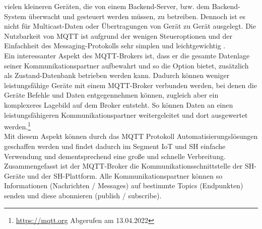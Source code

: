         vielen kleineren Geräten, die von einem Backend-Server, bzw. dem Backend-System überwacht und gesteuert werden müssen, zu 
        betreiben. Dennoch ist es nicht für Multicast-Daten oder Übertragungen von Gerät zu Gerät ausgelegt. Die Nutzbarkeit 
        von \acs{MQTT} ist aufgrund der wenigen Steueroptionen und der Einfachheit des Messaging-Protokolls sehr simplen und 
        leichtgewichtig \cite{Naik2017}. 
        \\
        \linebreak
        Ein interessanter Aspekt des \acs{MQTT}-Brokers ist, dass er die gesamte Datenlage seiner Kommunikationspartner aufbewahrt und 
        so die Option bietet, zusätzlich als Zustand-Datenbank betrieben werden kann. Dadurch können weniger leistungsfähige Geräte 
        mit einem \acs{MQTT}-Broker verbunden werden, bei denen die Geräte Befehle und Daten entgegennehmen können, zugleich aber ein 
        komplexeres Lagebild auf dem Broker entsteht. So können Daten an einen leistungsfähigeren Kommunikationspartner 
        weitergeleitet und dort ausgewertet werden.\footnote{\url{https://mqtt.org} Abgerufen am 13.04.2022}
        \\
        Mit diesem Aspekt können durch das \acl{MQTT} Protokoll Automatisierungslösungen geschaffen werden und findet dadurch im 
        Segment \acs{IoT} und \acl{SH} einfache Verwendung und dementsprechend eine große und schnelle Verbreitung. 
        \\
        \linebreak
        Zusammengefasst ist der \acs{MQTT}-Broker die Kommunikationsschnittstelle der \acl{SH}-Geräte und der \acl{SH}-Plattform. 
        Alle Kommunikationspartner können so Informationen (Nachrichten / Messages) auf bestimmte Topics (Endpunkten) senden und 
        diese abonnieren (publish / subscribe). 

